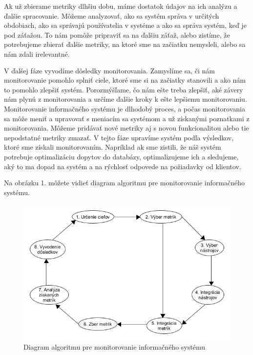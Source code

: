 \documentclass[a4paper, usesections, upjsfrontpage, thesismargins, thesislinespacing]{rnthesis}
\begin{document}
Ak už zbierame metriky dlhšiu dobu, máme dostatok údajov na ich analýzu a ďalšie spracovanie.
Môžeme analyzovať, ako sa systém správa v určitých obdobiach, ako sa správajú používatelia v systéme a ako sa správa systém, keď je pod záťažou. To nám pomôže pripraviť sa na ďalšiu záťaž, alebo zistíme, že potrebujeme zbierať ďalšie metriky, na ktoré sme na začiatku nemysleli, alebo sa nám zdali irelevantné.

V ďalšej fáze vyvodíme dôsledky monitorovania.
Zamyslíme sa, či nám monitorovanie pomohlo splniť ciele, ktoré sme si na začiatky stanovili a ako nám to pomohlo zlepšiť systém.
Porozmýšľame, čo nám ešte treba zlepšiť, aké závery nám plynú z monitorovania a určíme ďalšie kroky k ešte lepšiemu monitorovaniu.
Monitorovanie informačného systému je dlhodobý proces, a počas monitorovania sa môže meniť a upravovať s meniacím sa systémom a už získanými poznatkami z monitorovania.
Môžeme pridávať nové metriky aj s novou funkcionalitou alebo tie nepodstatné metriky zmazať.
V tejto fáze upravíme systém podľa výsledkov, ktoré sme získali monitorovaním.
Napríklad ak sme zistili, že náš systém potrebuje optimalizáciu dopytov do databázy, optimalizujeme ich a sledujeme, aký to ma dopad na systém a na rýchlosť odpovede na požiadavky od klientov.

Na obrázku 1. môžete vidieť diagram algoritmu pre monitorovanie informačného systému.

\begin{figure}
\begin{center}
\includegraphics[scale=0.41]{ais_algorithm.png}
\caption{Diagram algoritmu pre monitorovanie informačného systému}
\end{center}
\end{figure}
\end{document}
